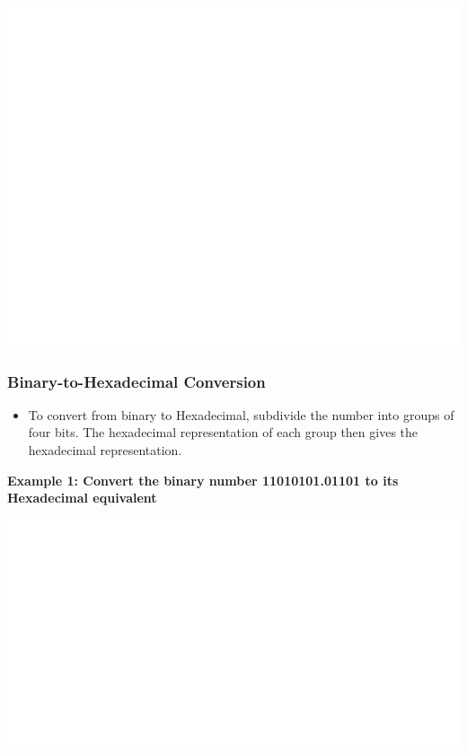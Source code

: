 \documentclass[]{book}
\providecommand{\tightlist}{%
  \setlength{\itemsep}{0pt}\setlength{\parskip}{0pt}}
\begin{document}
\begin{center}\includegraphics[width=1\linewidth]{figure/NSbox18-1} \end{center}

\hypertarget{binary-to-hexadecimal-conversion}{%
\subsubsection{Binary-to-Hexadecimal Conversion}\label{binary-to-hexadecimal-conversion}}

\begin{itemize}
\tightlist
\item
  To convert from binary to Hexadecimal, subdivide the number into groups of four bits. The hexadecimal representation of each group then gives the hexadecimal representation.
\end{itemize}

\textbf{Example 1: Convert the binary number 11010101.01101 to its Hexadecimal equivalent}

\begin{center}\includegraphics[width=1\linewidth]{figure/NSbox19-1} \end{center}
\end{document}
